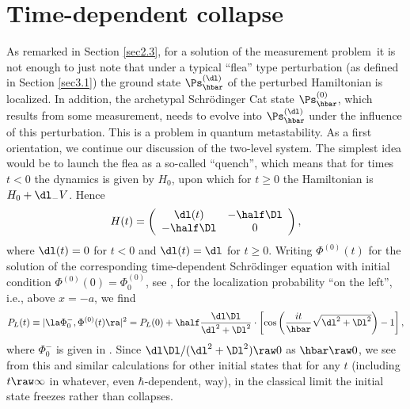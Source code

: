 \documentclass[12pt]{article}
\newcommand{\mmp}{measurement problem}
\begin{document}
\section{Time-dependent collapse}\label{Dynamical}
As remarked in Section \ref{sec2.3}, 
for a solution of the \mmp\ it is not enough to just note that under a typical ``flea'' type perturbation (as defined in Section \ref{sec3.1}) the ground state  $\Ps_{\hbar}^{(\dl)}$  of the perturbed Hamiltonian is localized. In addition, the archetypal Schr\"{o}dinger Cat state $\Ps_{\hbar}^{(0)}$, which results from some measurement, needs to evolve into $\Ps_{\hbar}^{(\dl)}$ under the influence of this perturbation. This is a problem in quantum metastability. As a first orientation, we continue our discussion of the two-level system. 
The simplest idea would be to launch the flea as a so-called ``quench'', which means that for times $t<0$ the dynamics is given by $H_0$, upon which for $t\geq 0$ the Hamiltonian is  $H_0+\dl_-V$. Hence
\begin{equation}
H(t)=
\left(
\begin{array}{cc}
 \dl(t) & -\half\Dl     \\
 -\half \Dl &  0
 \end{array}
\right),\label{HD2}
\end{equation}
where $\dl(t)=0$ for $t< 0$ and $\dl(t)=\dl$ for $t\geq 0$. Writing $\Phi^{(0)}(t)$ for the solution of the corresponding time-dependent  Schr\"{o}dinger equation with initial condition $\Phi^{(0)}(0)=\Phi^{(0)}_0$, see , for the localization probability ``on the left'', i.e., above $x=-a$, we  find
\begin{equation}
P_L(t)\equiv |\la \Phi_0^-, \Phi^{(0)}(t)\ra|^2=P_L(0)+\half\frac{\dl\Dl}{\dl^2+\Dl^2}\cdot\left[\cos\left(\frac{it}{\hbar}\sqrt{\dl^2+\Dl^2}\right)-1\right],
\end{equation}
where $\Phi_0^-$ is given in . Since $\dl\Dl/(\dl^2+\Dl^2)\raw 0$ as $\hbar\raw 0$, we see from this and similar calculations for other initial states that for any $t$ (including $t\raw\infty$ in whatever, even  $\hbar$-dependent, way),  in the classical limit the initial state freezes rather than collapses. 
\smallskip
\end{document}
